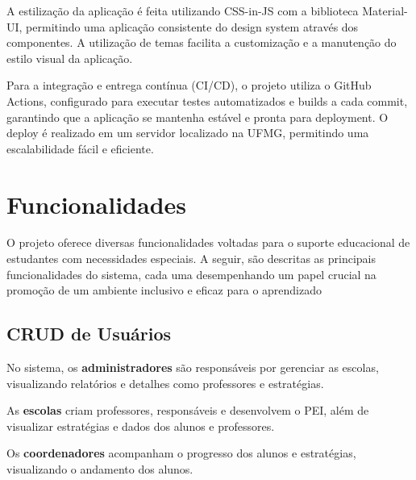 \documentclass[sigconf]{webmedia}
\begin{document}
A estilização da aplicação é feita utilizando CSS-in-JS com a biblioteca Material-UI,
 permitindo uma aplicação consistente do design system através dos componentes.
 A utilização de temas facilita a customização e a manutenção do estilo visual da
 aplicação.

Para a integração e entrega contínua (CI/CD), o projeto utiliza
o GitHub Actions, configurado para executar testes automatizados e builds a cada
commit, garantindo que a aplicação se mantenha estável e pronta para deployment.
O deploy é realizado em um servidor localizado na UFMG, permitindo uma escalabilidade
 fácil e eficiente.



\section{Funcionalidades}

O projeto oferece diversas funcionalidades voltadas para o suporte
educacional de estudantes com necessidades especiais. A seguir, são
descritas as principais funcionalidades do sistema, cada uma desempenhando
 um papel crucial na promoção de um ambiente inclusivo e eficaz para o
 aprendizado

\subsection{CRUD de Usuários}
No sistema, os {\bfseries administradores} são responsáveis por gerenciar as
escolas, visualizando relatórios e detalhes como professores e
estratégias.


As {\bfseries escolas}  criam professores, responsáveis e
desenvolvem o PEI, além de visualizar estratégias e dados dos alunos
e professores.

Os {\bfseries coordenadores}  acompanham o progresso dos alunos
e estratégias, visualizando o andamento dos alunos.
\end{document}
